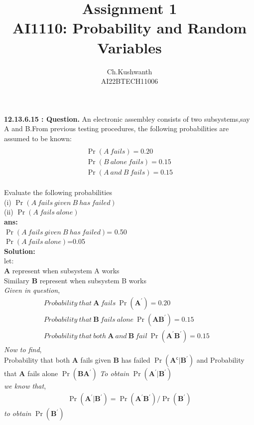 \documentclass[journal,12pt,twocolumn]{IEEEtran}
\title{\textbf{Assignment 1}
\\ \textbf{AI1110:} Probability and Random Variables}
\author{Ch.Kushwanth
\\ AI22BTECH11006}
\providecommand{\pr}[1]{\ensuremath{\Pr\left(#1\right)}}
\theoremstyle{remark}
\begin{document}
\maketitle
\textbf{12.13.6.15 : Question.}
An electronic assembley consists of two subsystems,say A and B.From previous testing procedures, the following probabilities are assumed to be known:
\begin{align*}
 \\\pr{A\  fails}=0.20
\\\pr{B \ alone\  fails}=0.15
 \\ \pr{A \ and \ B \ fails}=0.15
\end{align*}
\\ Evaluate the following probabilities
\\ (i) \pr{A\ fails\  given\ B\ has\ failed}
\\ (ii) \pr{A\ fails\ alone}
\\ \textbf{ans:}
\\ \pr{A\ fails\ given\ B\ has\ failed}= 0.50 
\\ \pr{A\ fails\ alone}=0.05
\\ \textbf{Solution:}
\\ let:
\\ \textbf{A} represent when subsystem A works
\\Similary \textbf{B} represent when subsystem B works
\\ \textit{Given in question},
\begin{align*}
Probability\ that\ \textbf{A}\ fails\  \pr{\textbf{A}^\prime} = 0.20
&\\Probability\ that\ \textbf{B}\ fails\ alone\ \pr{\textbf{A}\textbf{B}^ \prime}=0.15
&\\Probability\ that\ both\ \textbf{A}\ and\ \textbf{B}\ fail\ \pr{\textbf{A} ^\prime\textbf{B} ^\prime}=0.15
\end{align*}
\textit{Now to find},
\\Probability that both \textbf{A} fails given \textbf{B} has failed \pr{\textbf{A} ^\mathsf{c}|\textbf{B} ^\prime} and \mbox{Probability} that \textbf{A} fails alone \pr{\textbf{B}\textbf{A}^\prime}
\linebreak 
\textsl{To obtain }\pr{\textbf{A} ^\prime|\textbf{B} ^\prime}
\\ \textit{we know that},
\begin{align*}
 \pr{\textbf{A} ^\prime|\textbf{B} ^\prime}=\pr{ \textbf{A} ^\prime\textbf{B} ^\prime } /\pr{\textbf{B}^\prime}
\end{align*}
 \textsl{to obtain} \pr{\textbf{B} ^\prime} 
\end{document}
